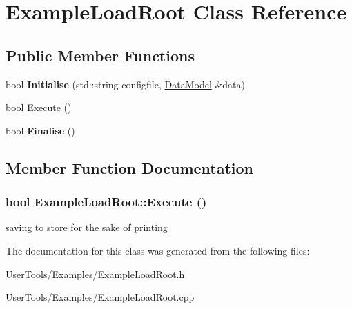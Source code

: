 \hypertarget{classExampleLoadRoot}{
\section{ExampleLoadRoot Class Reference}
\label{classExampleLoadRoot}
}
\subsection*{Public Member Functions}
\begin{DoxyCompactItemize}
\item 
\hypertarget{classExampleLoadRoot_a35f783852deea4191cf82812ccbd743c}{
bool {\bfseries Initialise} (std::string configfile, \hyperlink{classDataModel}{DataModel} \&data)}
\label{classExampleLoadRoot_a35f783852deea4191cf82812ccbd743c}

\item 
bool \hyperlink{classExampleLoadRoot_a463f4b53011e5fa862a3d39058305b83}{Execute} ()
\item 
\hypertarget{classExampleLoadRoot_aa919eb5fb4d16a7cf632b80a592970f2}{
bool {\bfseries Finalise} ()}
\label{classExampleLoadRoot_aa919eb5fb4d16a7cf632b80a592970f2}

\end{DoxyCompactItemize}


\subsection{Member Function Documentation}
\hypertarget{classExampleLoadRoot_a463f4b53011e5fa862a3d39058305b83}{
\subsubsection[{Execute}]{\setlength{\rightskip}{0pt plus 5cm}bool ExampleLoadRoot::Execute ()}}
\label{classExampleLoadRoot_a463f4b53011e5fa862a3d39058305b83}


saving to store for the sake of printing 

The documentation for this class was generated from the following files:\begin{DoxyCompactItemize}
\item 
UserTools/Examples/ExampleLoadRoot.h\item 
UserTools/Examples/ExampleLoadRoot.cpp\end{DoxyCompactItemize}
